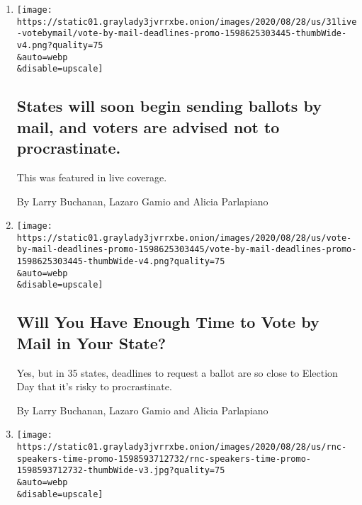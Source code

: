 \begin{enumerate}
\def\labelenumi{\arabic{enumi}.}
\item
  \href{/live/2020/08/31/us/trump-vs-biden/states-will-soon-begin-sending-ballots-by-mail-and-voters-are-advised-not-to-procrastinate}{}

  \texttt{[image: https://static01.graylady3jvrrxbe.onion/images/2020/08/28/us/31live-votebymail/vote-by-mail-deadlines-promo-1598625303445-thumbWide-v4.png?quality=75\\\&auto=webp\\\&disable=upscale]}

  \hypertarget{states-will-soon-begin-sending-ballots-by-mail-and-voters-are-advised-not-to-procrastinate}{%
  \subsection{States will soon begin sending ballots by mail, and voters
  are advised not to
  procrastinate.}\label{states-will-soon-begin-sending-ballots-by-mail-and-voters-are-advised-not-to-procrastinate}}

  This was featured in live coverage.

  By Larry Buchanan, Lazaro Gamio and Alicia Parlapiano
\item
  \href{/interactive/2020/08/31/us/politics/vote-by-mail-deadlines.html}{}

  \texttt{[image: https://static01.graylady3jvrrxbe.onion/images/2020/08/28/us/vote-by-mail-deadlines-promo-1598625303445/vote-by-mail-deadlines-promo-1598625303445-thumbWide-v4.png?quality=75\\\&auto=webp\\\&disable=upscale]}

  \hypertarget{will-you-have-enough-time-to-vote-by-mail-in-your-state}{%
  \subsection{Will You Have Enough Time to Vote by Mail in Your
  State?}\label{will-you-have-enough-time-to-vote-by-mail-in-your-state}}

  Yes, but in 35 states, deadlines to request a ballot are so close to
  Election Day that it's risky to procrastinate.

  By Larry Buchanan, Lazaro Gamio and Alicia Parlapiano
\item
  \href{/interactive/2020/08/28/us/politics/rnc-speakers-time.html}{}

  \texttt{[image: https://static01.graylady3jvrrxbe.onion/images/2020/08/28/us/rnc-speakers-time-promo-1598593712732/rnc-speakers-time-promo-1598593712732-thumbWide-v3.jpg?quality=75\\\&auto=webp\\\&disable=upscale]}


\end{enumerate}
